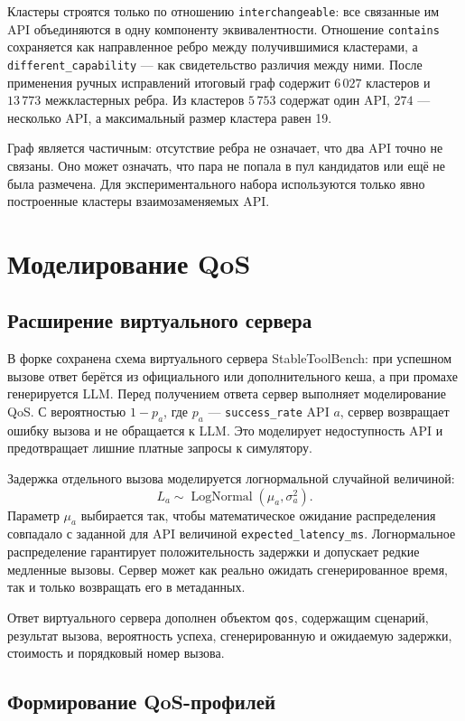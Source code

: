 \documentclass[12pt,a4paper]{article}
\begin{document}
Кластеры строятся только по отношению \texttt{interchangeable}: все связанные
им API объединяются в одну компоненту эквивалентности. Отношение
\texttt{contains} сохраняется как направленное ребро между получившимися
кластерами, а \texttt{different\_capability} --- как свидетельство различия
между ними. После применения ручных исправлений итоговый граф содержит
$6\,027$ кластеров и $13\,773$ межкластерных ребра. Из кластеров $5\,753$
содержат один API, $274$ --- несколько API, а максимальный размер кластера
равен 19.

Граф является частичным: отсутствие ребра не означает, что два API точно не
связаны. Оно может означать, что пара не попала в пул кандидатов или ещё не
была размечена. Для экспериментального набора используются только явно
построенные кластеры взаимозаменяемых API.

\section{Моделирование QoS}

\subsection{Расширение виртуального сервера}

В форке сохранена схема виртуального сервера StableToolBench: при успешном
вызове ответ берётся из официального или дополнительного кеша, а при промахе
генерируется LLM. Перед получением ответа сервер выполняет моделирование QoS.
С вероятностью $1-p_a$, где $p_a$ --- \texttt{success\_rate} API $a$, сервер
возвращает ошибку вызова и не обращается к LLM. Это моделирует недоступность API
и предотвращает лишние платные запросы к симулятору.

Задержка отдельного вызова моделируется логнормальной случайной величиной:
\[
L_a \sim \operatorname{LogNormal}(\mu_a,\sigma_a^2).
\]
Параметр $\mu_a$ выбирается так, чтобы математическое ожидание распределения
совпадало с заданной для API величиной \texttt{expected\_latency\_ms}.
Логнормальное распределение гарантирует положительность задержки и допускает
редкие медленные вызовы. Сервер может как реально ожидать сгенерированное
время, так и только возвращать его в метаданных.

Ответ виртуального сервера дополнен объектом \texttt{qos}, содержащим сценарий,
результат вызова, вероятность успеха, сгенерированную и ожидаемую задержки,
стоимость и порядковый номер вызова.

\subsection{Формирование QoS-профилей}
\end{document}
